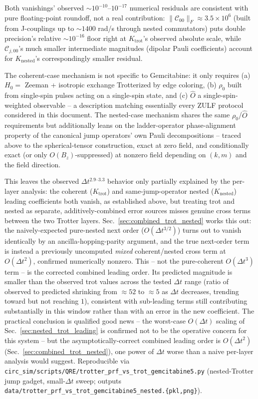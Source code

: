 \documentclass[11pt]{article}
\newcommand{\Dt}{\Delta t}
\newcommand{\calC}{\mathcal{C}}
\begin{document}
Both vanishings' observed $\sim10^{-10}$--$10^{-17}$ numerical residuals are consistent with pure floating-point roundoff, not a real contribution: $\|\calC_{00}\|_F\approx3.5\times10^6$ (built from J-couplings up to $\sim1400$ rad/s through nested commutators) puts double precision's relative $\sim10^{-16}$ floor right at $K_{\text{trot}}$'s observed absolute scale, while $\calC_{j,00}$'s much smaller intermediate magnitudes (dipolar Pauli coefficients) account for $K_{\text{nested}}$'s correspondingly smaller residual.

The coherent-case mechanism is not specific to Gemcitabine: it only requires (a) $H_0=$ Zeeman + isotropic exchange Trotterized by edge coloring, (b) $\rho_0$ built from single-spin pulses acting on a single-spin state, and (c) $\hat{O}$ a single-spin-weighted observable -- a description matching essentially every ZULF protocol considered in this document. The nested-case mechanism shares the same $\rho_0$/$\hat{O}$ requirements but additionally leans on the ladder-operator phase-alignment property of the canonical jump operators' own Pauli decompositions -- traced above to the spherical-tensor construction, exact at zero field, and conditionally exact (or only $O(B_z)$-suppressed) at nonzero field depending on $(k,m)$ and the field direction.

This leaves the observed $\Dt^{2.9\text{--}3.3}$ behavior only partially explained by the per-layer analysis: the coherent ($K_{\text{trot}}$) and same-jump-operator nested ($K_{\text{nested}}$) leading coefficients both vanish, as established above, but treating trot and nested as separate, additively-combined error sources misses genuine cross terms between the two Trotter layers. Sec.~\ref{sec:combined_trot_nested} works this out: the naively-expected pure-nested next order ($O(\Dt^{3/2})$) turns out to vanish identically by an ancilla-hopping-parity argument, and the true next-order term is instead a previously uncomputed \emph{mixed} coherent/nested cross term at $O(\Dt^2)$, confirmed numerically nonzero. This -- not the pure-coherent $O(\Dt^3)$ term -- is the corrected combined leading order. Its predicted magnitude is smaller than the observed trot values across the tested $\Dt$ range (ratio of observed to predicted shrinking from $\approx52$ to $\approx5$ as $\Dt$ decreases, trending toward but not reaching $1$), consistent with sub-leading terms still contributing substantially in this window rather than with an error in the new coefficient. The practical conclusion is qualified good news -- the worst-case $O(\Dt)$ scaling of Sec.~\ref{sec:nested_trot_leading} is confirmed not to be the operative concern for this system -- but the asymptotically-correct combined leading order is $O(\Dt^2)$ (Sec.~\ref{sec:combined_trot_nested}), one power of $\Dt$ worse than a naive per-layer analysis would suggest. Reproducible via \texttt{circ\_sim/scripts/QRE/trotter\_prf\_vs\_trot\_gemcitabine5.py} (nested-Trotter jump gadget, small-$\Dt$ sweep; outputs \texttt{data/trotter\_prf\_vs\_trot\_gemcitabine5\_nested.\{pkl,png\}}).
\end{document}
